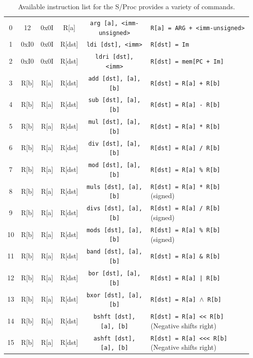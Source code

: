 \documentclass{article}
\begin{document}
\begin{table}[h!]
\begin{footnotesize}
\begin{tabular}{cccc|c|l}
            0 & 12 & 0x0I & R[a] & \texttt{arg [a], <imm-unsigned>} & \texttt{R[a] = ARG + <imm-unsigned>} \\
            1 & 0xI0 & 0x0I & R[dst] & \texttt{ldi [dst], <imm>} & \texttt{R[dst] = Im} \\
            2 & 0xI0 & 0x0I & R[dst] & \texttt{ldri [dst], <imm>} & \texttt{R[dst] = mem[PC + Im]} \\
            3 & R[b] & R[a] & R[dst] & \texttt{add [dst], [a], [b]} & \texttt{R[dst] = R[a] + R[b]} \\
            4 & R[b] & R[a] & R[dst] & \texttt{sub [dst], [a], [b]} & \texttt{R[dst] = R[a] - R[b]} \\
            5 & R[b] & R[a] & R[dst] & \texttt{mul [dst], [a], [b]} & \texttt{R[dst] = R[a] * R[b]} \\
            6 & R[b] & R[a] & R[dst] & \texttt{div [dst], [a], [b]} & \texttt{R[dst] = R[a] / R[b]} \\
            7 & R[b] & R[a] & R[dst] & \texttt{mod [dst], [a], [b]} & \texttt{R[dst] = R[a] \% R[b]} \\
            8 & R[b] & R[a] & R[dst] & \texttt{muls [dst], [a], [b]} & \texttt{R[dst] = R[a] * R[b]} (signed) \\
            9 & R[b] & R[a] & R[dst] & \texttt{divs [dst], [a], [b]} & \texttt{R[dst] = R[a] / R[b]} (signed) \\
            10 & R[b] & R[a] & R[dst] & \texttt{mods [dst], [a], [b]} & \texttt{R[dst] = R[a] \% R[b]} (signed) \\
            11 & R[b] & R[a] & R[dst] & \texttt{band [dst], [a], [b]} & \texttt{R[dst] = R[a] \& R[b]} \\
            12 & R[b] & R[a] & R[dst] & \texttt{bor [dst], [a], [b]} & \texttt{R[dst] = R[a] | R[b]} \\
            13 & R[b] & R[a] & R[dst] & \texttt{bxor [dst], [a], [b]} & \texttt{R[dst] = R[a] $\wedge$ R[b]} \\
            14 & R[b] & R[a] & R[dst] & \texttt{bshft [dst], [a], [b]} & \texttt{R[dst] = R[a] << R[b]} (Negative shifts right) \\
            15 & R[b] & R[a] & R[dst] & \texttt{ashft [dst], [a], [b]} & \texttt{R[dst] = R[a] <<< R[b]} (Negative shifts right) \\
            \hline
        \end{tabular}
    \end{footnotesize}
    \caption{Available instruction list for the S/Proc provides a variety of commands.}
    \label{table:instruction-table}
\end{table}
\end{document}
